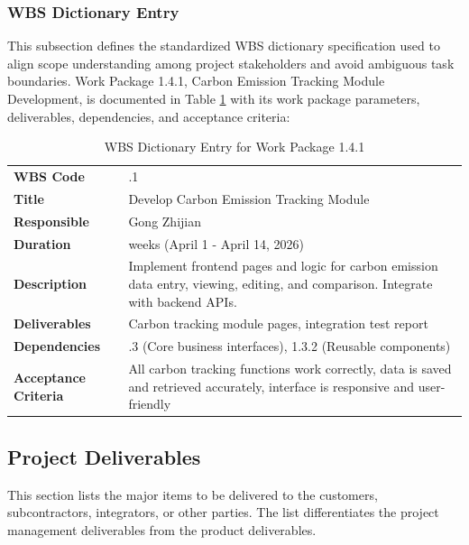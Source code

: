 \documentclass[12pt,a4paper]{article}
\begin{document}
\subsubsection{WBS Dictionary Entry}
This subsection defines the standardized WBS dictionary specification used to align scope understanding among project stakeholders and avoid ambiguous task boundaries. Work Package 1.4.1, Carbon Emission Tracking Module Development, is documented in Table \ref{WBSDictionary} with its work package parameters, deliverables, dependencies, and acceptance criteria:
\begin{longtable}{@{}l >{\raggedright\arraybackslash}p{11cm}@{}}
\caption{WBS Dictionary Entry for Work Package 1.4.1}\label{WBSDictionary}\\
\toprule
\textbf{WBS Code} & 1.4.1 \\
\textbf{Title} & Develop Carbon Emission Tracking Module \\
\textbf{Responsible} & Gong Zhijian \\
\textbf{Duration} & 2 weeks (April 1 - April 14, 2026) \\
\textbf{Description} & Implement frontend pages and logic for carbon emission data entry, viewing, editing, and comparison. Integrate with backend APIs. \\
\textbf{Deliverables} & Carbon tracking module pages, integration test report \\
\textbf{Dependencies} & 1.2.3 (Core business interfaces), 1.3.2 (Reusable components) \\
\textbf{Acceptance Criteria} & All carbon tracking functions work correctly, data is saved and retrieved accurately, interface is responsive and user-friendly \\ \bottomrule
\end{longtable}

\subsection{Project Deliverables}
This section lists the major items to be delivered to the customers, subcontractors, integrators, or other parties. The list differentiates the project management deliverables from the product deliverables.
\end{document}
